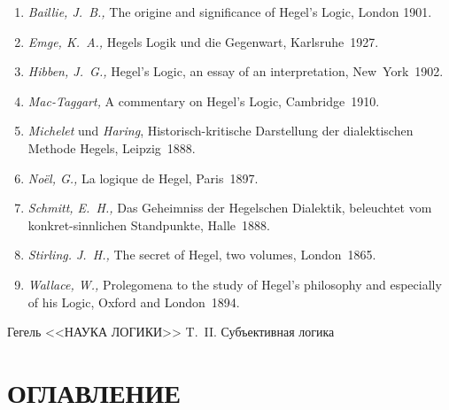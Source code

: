 \begin{enumerate}
\item{\em Baillie, J.~B.,} The origine and signi\-ficance of Hegel's Logic,
London 1901.
\item{\em Emge, K.~A.,} Hegels Logik und die Gegenwart, Karlsruhe~1927.
\item{\em Hibben, J.~G.,} Hegel's Logic, an essay of an interpre\-tation,
New~York~1902.
\item{\em Mac-Taggart,} A commentary on Hegel's Logic, Cambridge~1910.
\item{\em Michelet} und {\em Haring}, Historisch-kritische Darstellung
der dialekti\-schen Methode Hegels, Leipzig~1888.
\item{\em Noël, G.,} La logique de Hegel, Paris~1897.
\item{\em Schmitt, E.~H.,} Das Geheimniss der Hegelschen Dialektik, beleuchtet
vom konkret-sinnlichen Stand\-punkte, Halle~1888.
\item{\em Stirling. J.~H.,} The secret of Hegel, two volumes, London~1865.
\item{\em Wallace, W.,} Prolegomena to the study of Hegel's philosophy and
especially of his Logic, Oxford and London~1894.
\end{enumerate}

\clearpage
\bigskip
\printpagenotes
\bigskip
\bigskip

{\centering Гегель <<НАУКА ЛОГИКИ>> T.~II. Субъективная логика \par}

\renewcommand\contentsname{}
\section*[Оглавление]{ОГЛАВЛЕНИЕ}
\tableofcontents

\bigskip
\clearpage
\bigskip
